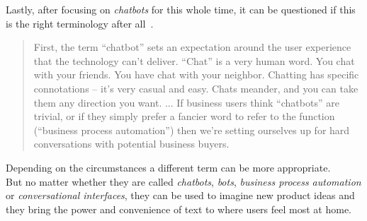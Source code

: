 Lastly, after focusing on \emph{chatbots} for this whole time,
it can be questioned if this is the right terminology after all~\cite{botnerds}.

\begin{quote}
First, the term “chatbot” sets an expectation around the user experience that the technology can’t deliver.
“Chat” is a very human word.
You chat with your friends.
You have chat with your neighbor.
Chatting has specific connotations – it’s very casual and easy.
Chats meander, and you can take them any direction you want.
...
If business users think “chatbots” are trivial, or if they simply prefer a fancier word to refer to the function (“business process automation”) then we’re setting ourselves up for hard conversations with potential business buyers.
\end{quote}

Depending on the circumstances a different term can be more appropriate.
\\

But no matter whether they are called \emph{chatbots}, \emph{bots}, \emph{business process automation} or \emph{conversational interfaces},
they can be used to imagine new product ideas and they bring the power and convenience of text to where users feel most at home.
